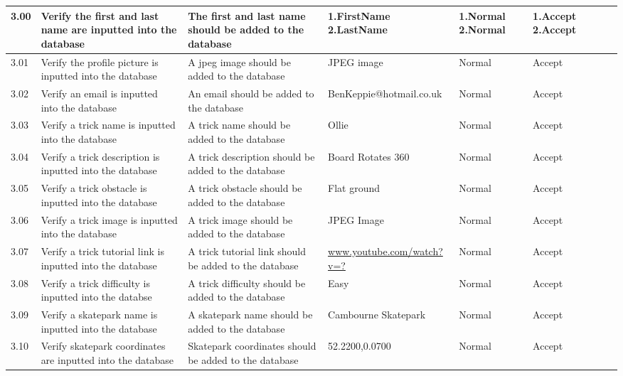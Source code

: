 \begin{landscape}
\begin{center}
\begin{longtable}{|p{1.5cm}|p{2.5cm}|p{2.5cm}|p{2cm}|p{2cm}|p{2cm}|p{2cm}|p{2cm}|}
3.00 & Verify the first and last name are inputted into the database & The first and last name should be added to the database & 1.FirstName 2.LastName & 1.Normal 2.Normal & 1.Accept 2.Accept & &  \\ \hline

3.01 & Verify the profile picture is inputted into the database & A jpeg image should be added to the database & JPEG image & Normal & Accept & & \\ \hline

3.02 & Verify an email is inputted into the database & An email should be added to the database & BenKeppie@hotmail.co.uk & Normal & Accept  & & \\ \hline

3.03 & Verify a trick name is inputted into the database & A trick name should be added to the database & Ollie & Normal & Accept & & \\ \hline

3.04 & Verify a trick description is inputted into the database & A trick description should be added to the database & Board Rotates 360 & Normal & Accept & & \\ \hline

3.05  & Verify a trick obstacle is inputted into the database & A trick obstacle should be added to the database & Flat ground & Normal & Accept & & \\ \hline

3.06 & Verify a trick image is inputted into the database & A trick image should be added to the database & JPEG Image & Normal & Accept & & \\ \hline

3.07 & Verify a trick tutorial link is inputted into the database & A trick tutorial link should be added to the database & \url{www.youtube.com/watch?v=?} & Normal & Accept & & \\ \hline

3.08 & Verify a trick difficulty is inputted into the databse & A trick difficulty should be added to the database & Easy & Normal & Accept & & \\ \hline

3.09 & Verify a skatepark name is inputted into the database & A skatepark name should be added to the database & Cambourne Skatepark & Normal & Accept & & \\ \hline

3.10 & Verify skatepark coordinates are inputted into the database & Skatepark coordinates should be added to the database & 52.2200,0.0700 & Normal & Accept & & \\ \hline


\end{longtable}
\end{center}
\end{landscape}
